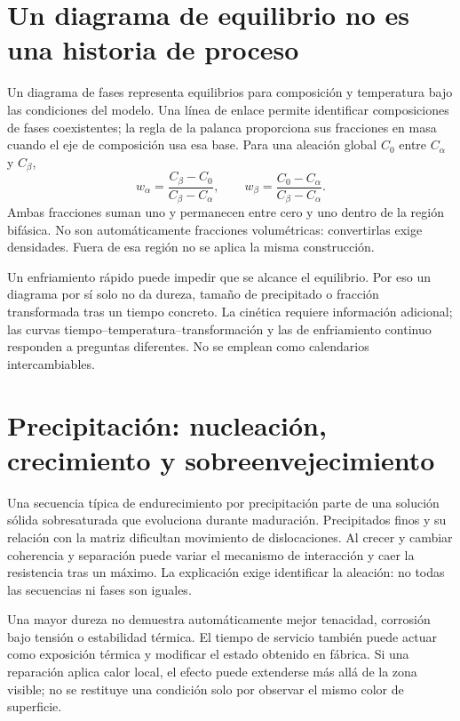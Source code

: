 
\section{Un diagrama de equilibrio no es una historia de proceso}
Un diagrama de fases representa equilibrios para composición y temperatura bajo las condiciones del modelo. Una línea de enlace permite identificar composiciones de fases coexistentes; la regla de la palanca proporciona sus fracciones en masa cuando el eje de composición usa esa base. Para una aleación global $C_0$ entre $C_\alpha$ y $C_\beta$,
\begin{equation}w_\alpha=\frac{C_\beta-C_0}{C_\beta-C_\alpha},\qquad w_\beta=\frac{C_0-C_\alpha}{C_\beta-C_\alpha}.\end{equation}
Ambas fracciones suman uno y permanecen entre cero y uno dentro de la región bifásica. No son automáticamente fracciones volumétricas: convertirlas exige densidades. Fuera de esa región no se aplica la misma construcción.

Un enfriamiento rápido puede impedir que se alcance el equilibrio. Por eso un diagrama por sí solo no da dureza, tamaño de precipitado o fracción transformada tras un tiempo concreto. La cinética requiere información adicional; las curvas tiempo--temperatura--transformación y las de enfriamiento continuo responden a preguntas diferentes. No se emplean como calendarios intercambiables.
\section{Precipitación: nucleación, crecimiento y sobreenvejecimiento}
Una secuencia típica de endurecimiento por precipitación parte de una solución sólida sobresaturada que evoluciona durante maduración. Precipitados finos y su relación con la matriz dificultan movimiento de dislocaciones. Al crecer y cambiar coherencia y separación puede variar el mecanismo de interacción y caer la resistencia tras un máximo. La explicación exige identificar la aleación: no todas las secuencias ni fases son iguales.

Una mayor dureza no demuestra automáticamente mejor tenacidad, corrosión bajo tensión o estabilidad térmica. El tiempo de servicio también puede actuar como exposición térmica y modificar el estado obtenido en fábrica. Si una reparación aplica calor local, el efecto puede extenderse más allá de la zona visible; no se restituye una condición solo por observar el mismo color de superficie.
